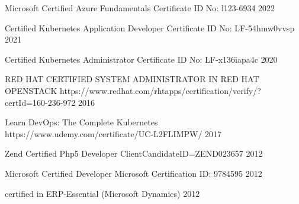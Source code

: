 

\cvsubsection{}


\begin{cvhonors}

\cvhonor
    {Microsoft Certified Azure Fundamentals} %
    {Certificate ID No: l123-6934} %
    {} %
    {2022} %


\cvhonor
    {Certified Kubernetes Application Developer} %
    {Certificate ID No: LF-54hmw0vvsp} %
    {} %
    {2021} %

  \cvhonor
    {Certified Kubernetes Administrator} %
    {Certificate ID No: LF-x136iapa4c} %
    {} %
    {2020} %

  \cvhonor
    {RED HAT CERTIFIED SYSTEM ADMINISTRATOR IN RED HAT OPENSTACK} %
    {https://www.redhat.com/rhtapps/certification/verify/?certId=160-236-972} %
    {} %
    {2016} %

  \cvhonor
    {Learn DevOps: The Complete Kubernetes} %
    {https://www.udemy.com/certificate/UC-L2FLIMPW/} %
    {} %
    {2017} %

  \cvhonor
    {Zend Certified Php5 Developer} %
    {ClientCandidateID=ZEND023657} %
    {} %
    {2012} %

  \cvhonor
    {Microsoft Certified Developer} %
    {Microsoft Certification ID:  9784595} %
    {} %
    {2012} %

  \cvhonor
    {certified in ERP-Essential (Microsoft Dynamics)} %
    {} %
    {} %
    {2012} %


\end{cvhonors}
